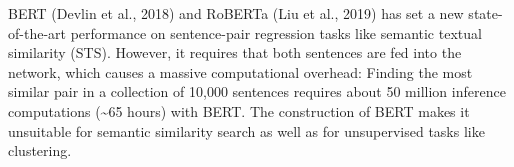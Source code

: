 BERT (Devlin et al., 2018) and RoBERTa (Liu et al., 2019) has set a new state-of-the-art performance on sentence-pair regression tasks like semantic textual similarity (STS). However, it requires that both sentences are fed into the network, which causes a massive computational overhead: Finding the most similar pair in a collection of 10,000 sentences requires about 50 million inference computations ({\textasciitilde}65 hours) with BERT. The construction of BERT makes it unsuitable for semantic similarity search as well as for unsupervised tasks like clustering.